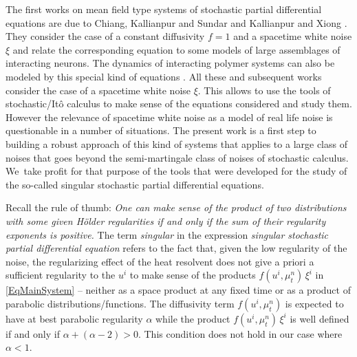 \documentclass[10pt]{amsart}
\theoremstyle{definition}
\begin{document}
The first works on mean field type systems of stochastic partial differential equations are due to Chiang, Kallianpur and Sundar \cite{CKS} and Kallianpur and Xiong \cite{KX}. They consider the case of a constant diffusivity $f=1$ and a spacetime white noise $\xi$ and relate the corresponding equation to some models of large assemblages of interacting neurons. The dynamics of interacting polymer systems can also be modeled by this special kind of equations \cite{EShen, Criens}. All these and subsequent works consider the case of a spacetime white noise $\xi$. This allows to use the tools of stochastic/Itô calculus to make sense of the equations considered and study them. However the relevance of spacetime white noise as a model of real life noise is questionable in a number of situations. The present work is a first step to building a robust approach of this kind of systems that applies to a large class of noises that goes beyond the semi-martingale class of noises of stochastic calculus. We~take profit for that purpose of the tools that were developed for the study of the so-called singular stochastic partial differential equations.

Recall the rule of thumb: \emph{One can make sense of the product of two distributions with some given Hölder regularities if and only if the sum of their regularity exponents is positive.} The term \emph{singular} in the expression \emph{singular stochastic partial differential equation} refers to the fact that, given the low regularity of the noise, the regularizing effect of the heat resolvent does not give a priori a sufficient regularity to the $u^i$ to make sense of the products $f(u^i,\mu_t^n)\,\xi^i$ in \eqref{EqMainSystem} -- neither as a space product at any fixed time or as a product of parabolic distributions/functions. The diffusivity term $f(u^i,\mu_t^n)$ is expected to have at best parabolic regularity $\alpha$ while the product $f(u^i,\mu_t^n)\,\xi^i$ is well defined if and only if $\alpha+(\alpha-2)>0$. This condition does not hold in our case where $\alpha<1$.
\end{document}
